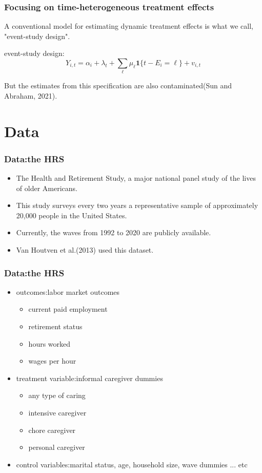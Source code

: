 \documentclass{beamer}
\begin{document}
        \begin{frame}\frametitle{Focusing on time-heterogeneous treatment effects}
            A conventional model for estimating dynamic treatment effects is what we call, "event-study design".
            \begin{block}{event-study design:}
                \begin{equation*}
                    Y_{i,t} = \alpha_{i} + \lambda_{t} + \sum_{\ell}\mu_{\ell}\mathbf{1}\{t-E_{i} = \ell\} + \mathit{v}_{i,t}
                \end{equation*}
            \end{block}
            But the estimates from this specification are also contaminated(Sun and Abraham, 2021).
        \end{frame}

\section{Data}
    \begin{frame}\frametitle{Data:the HRS}
        \begin{itemize}
            \item The Health and Retirement Study, a major national panel study of the lives of older Americans.
            \item This study surveys every two years a representative sample of approximately 20,000 people in the United States.
            \item Currently, the waves from 1992 to 2020 are publicly available.
            \item Van Houtven et al.(2013) used this dataset.
        \end{itemize}
    \end{frame}
    \begin{frame}\frametitle{Data:the HRS}
        \begin{itemize}
            \item outcomes:labor market outcomes
            \begin{itemize}
                \item current paid employment
                \item retirement status
                \item hours worked
                \item wages per hour
            \end{itemize}
            \item treatment variable:informal caregiver dummies
            \begin{itemize}
                \item any type of caring
                \item intensive caregiver 
                \item chore caregiver
                \item personal caregiver
            \end{itemize}
            \item control variables:marital status, age, household size, wave dummies ... etc
        \end{itemize}
    \end{frame}
\end{document}
